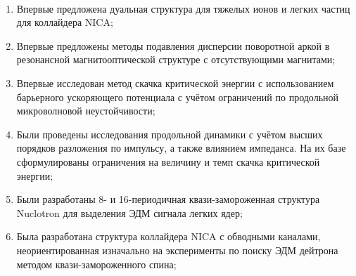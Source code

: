 ~\\
\par {\novelty}
\begin{enumerate}[beginpenalty=10000] %
	\item	Впервые предложена дуальная структура для тяжелых ионов и легких частиц для коллайдера NICA;
	\item 	Впервые предложены методы подавления дисперсии поворотной аркой в резонансной магнитооптической структуре с отсутствующими магнитами;
	\item 	Впервые исследован метод скачка критической энергии с использованием барьерного ускоряющего потенциала с учётом ограничений по продольной микроволновой неустойчивости;
	\item	Были проведены исследования продольной динамики с учётом высших порядков разложения по импульсу, а также влиянием импеданса. На их базе сформулированы ограничения на величину и темп скачка критической энергии;
	\item	Были разработаны 8- и 16-периодичная квази-замороженная структура Nuclotron для выделения ЭДМ сигнала легких ядер;
	\item	Была разработана структура коллайдера NICA с обводными каналами, неориентированная изначально на эксперименты по поиску ЭДМ дейтрона методом квази-замороженного спина;
\end{enumerate}
